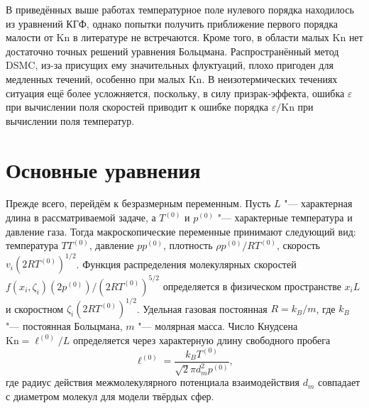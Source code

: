 \documentclass[
aps,%
12pt,%
final,%
notitlepage,%
oneside,%
onecolumn,%
nobibnotes,%
nofootinbib,%
superscriptaddress,%
noshowpacs,%
centertags]%
{revtex4}
\newcommand{\Kn}{\mathrm{Kn}}
\begin{document}
В приведённых выше работах температурное поле нулевого порядка находилось из уравнений КГФ,
однако попытки получить приближение первого порядка малости от \(\Kn\) в литературе не встречаются.
Кроме того, в области малых \(\Kn\) нет достаточно точных решений уравнения Больцмана.
Распространённый метод DSMC, из-за присущих ему значительных флуктуаций, плохо пригоден
для медленных течений, особенно при малых \(\Kn\). В неизотермических течениях ситуация
ещё более усложняется, поскольку, в силу призрак-эффекта, ошибка \(\varepsilon\)
при вычислении поля скоростей приводит к ошибке порядка \(\varepsilon/\Kn\) при вычислении поля температур.

\section{Основные уравнения}

Прежде всего, перейдём к безразмерным переменным.
Пусть \(L\) "--- характерная длина в рассматриваемой задаче,
а \(T^{(0)}\) и \(p^{(0)}\) "--- характерные температура и давление газа.
Тогда макроскопические переменные принимают следующий вид:
температура \(TT^{(0)}\), давление \(pp^{(0)}\),
плотность \(\rho p^{(0)}/RT^{(0)}\), скорость \(v_i(2RT^{(0)})^{1/2}\).
Функция распределения молекулярных скоростей \(f(x_i,\zeta_i)(2p^{(0)})/(2RT^{(0)})^{5/2}\)
определяется в физическом пространстве \(x_iL\) и скоростном \(\zeta_i(2RT^{(0)})^{1/2}\).
Удельная газовая постоянная \(R = k_B/m\), где \(k_B\) "--- постоянная Больцмана,
\(m\) "--- молярная масса.
Число Кнудсена \(\Kn = \ell^{(0)}/L\) определяется через характерную длину свободного пробега
\begin{equation}\label{eq:ell}
    \ell^{(0)} = \frac{k_B T^{(0)}}{\sqrt2\pi d_m^2 p^{(0)}},
\end{equation}
где радиус действия межмолекулярного потенциала взаимодействия \(d_m\)
совпадает с диаметром молекул для модели твёрдых сфер.
\end{document}
